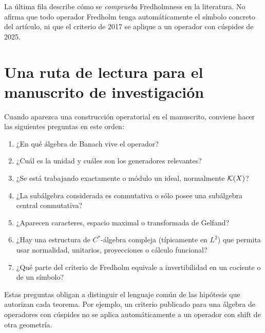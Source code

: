\begin{center}
\end{center}

La última fila describe cómo se \emph{comprueba} Fredholmness en la
literatura. No afirma que todo operador Fredholm tenga automáticamente
el símbolo concreto del artículo, ni que el criterio de 2017 se aplique
a un operador con cúspides de 2025.

\section{Una ruta de lectura para el manuscrito de investigación}

Cuando aparezca una construcción operatorial en el manuscrito, conviene hacer las siguientes
preguntas en este orden:
\begin{enumerate}
\item ¿En qué álgebra de Banach vive el operador?
\item ¿Cuál es la unidad y cuáles son los generadores relevantes?
\item ¿Se está trabajando exactamente o módulo un ideal, normalmente $\mathcal K(X)$?
\item ¿La subálgebra considerada es conmutativa o sólo posee una subálgebra central conmutativa?
\item ¿Aparecen caracteres, espacio maximal o transformada de Gelfand?
\item ¿Hay una estructura de $C^*$-álgebra compleja (típicamente en $L^2$) que permita usar normalidad, unitarios,
      proyecciones o cálculo funcional?
\item ¿Qué parte del criterio de Fredholm equivale a invertibilidad en un cociente o de un símbolo?
\end{enumerate}

Estas preguntas obligan a distinguir el lenguaje común de las hipótesis que autorizan
cada teorema. Por ejemplo, un criterio publicado para una álgebra de operadores con cúspides
no se aplica automáticamente a un operador con shift de otra geometría.
